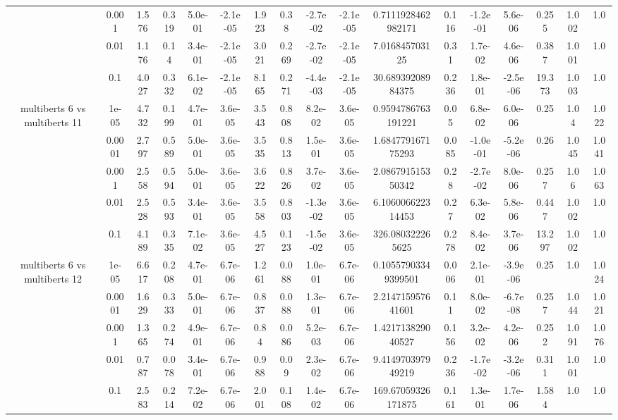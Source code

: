 \begin{tabular}{|c|c|c|c|c|c|c|c|c|c|c|c|c|c|c|c|c|}
 & 0.001 & 1.576 & 0.319 & 5.0e-01 & -2.1e-05 & 1.923 & 0.38 & -2.7e-02 & -2.1e-05 & 0.7111928462982171 & 0.116 & -1.2e-01 & 5.6e-06 & 0.255 & 1.002 & 1.0 \\
 & 0.01 & 1.176 & 0.14 & 3.4e-01 & -2.1e-05 & 3.021 & 0.269 & -2.7e-02 & -2.1e-05 & 7.016845703125 & 0.31 & 1.7e-02 & 4.6e-06 & 0.387 & 1.001 & 1.0 \\
 & 0.1 & 4.027 & 0.332 & 6.1e-02 & -2.1e-05 & 8.165 & 0.271 & -4.4e-03 & -2.1e-05 & 30.68939208984375 & 0.236 & 1.8e-01 & -2.5e-06 & 19.373 & 1.003 & 1.0 \\
\hline
\multirow{5}{*}{multiberts 6 vs multiberts 11} & 1e-05 & 4.732 & 0.199 & 4.7e-01 & 3.6e-05 & 3.543 & 0.808 & 8.2e-02 & 3.6e-05 & 0.9594786763191221 & 0.05 & 6.8e-02 & 6.0e-06 & 0.25 & 1.04 & 1.022 \\
 & 0.0001 & 2.797 & 0.589 & 5.0e-01 & 3.6e-05 & 3.535 & 0.813 & 1.5e-01 & 3.6e-05 & 1.684779167175293 & 0.085 & -1.0e-01 & -5.2e-06 & 0.26 & 1.045 & 1.041 \\
 & 0.001 & 2.558 & 0.594 & 5.0e-01 & 3.6e-05 & 3.622 & 0.826 & 3.7e-02 & 3.6e-05 & 2.086791515350342 & 0.28 & -2.7e-02 & 8.0e-06 & 0.257 & 1.06 & 1.063 \\
 & 0.01 & 2.528 & 0.593 & 3.4e-01 & 3.6e-05 & 3.558 & 0.803 & -1.3e-02 & 3.6e-05 & 6.106006622314453 & 0.27 & 6.3e-02 & 5.8e-06 & 0.447 & 1.002 & 1.0 \\
 & 0.1 & 4.189 & 0.335 & 7.1e-02 & 3.6e-05 & 4.527 & 0.123 & -1.5e-02 & 3.6e-05 & 326.080322265625 & 0.278 & 8.4e-02 & 3.7e-06 & 13.297 & 1.002 & 1.0 \\
\hline
\multirow{5}{*}{multiberts 6 vs multiberts 12} & 1e-05 & 6.617 & 0.208 & 4.7e-01 & 6.7e-06 & 1.261 & 0.088 & 1.0e-01 & 6.7e-06 & 0.10557903349399501 & 0.006 & 2.1e-01 & -3.9e-06 & 0.25 & 1.0 & 1.024 \\
 & 0.0001 & 1.629 & 0.333 & 5.0e-01 & 6.7e-06 & 0.837 & 0.088 & 1.3e-01 & 6.7e-06 & 2.214715957641601 & 0.11 & 8.0e-02 & -6.7e-08 & 0.257 & 1.044 & 1.021 \\
 & 0.001 & 1.365 & 0.274 & 4.9e-01 & 6.7e-06 & 0.84 & 0.086 & 5.2e-03 & 6.7e-06 & 1.421713829040527 & 0.156 & 3.2e-02 & 4.2e-06 & 0.252 & 1.091 & 1.076 \\
 & 0.01 & 0.787 & 0.078 & 3.4e-01 & 6.7e-06 & 0.988 & 0.09 & 2.3e-02 & 6.7e-06 & 9.414970397949219 & 0.236 & -1.7e-02 & -3.2e-06 & 0.311 & 1.001 & 1.0 \\
 & 0.1 & 2.583 & 0.214 & 7.2e-02 & 6.7e-06 & 2.001 & 0.108 & 1.4e-02 & 6.7e-06 & 169.67059326171875 & 0.161 & 1.3e-01 & 1.7e-06 & 1.584 & 1.0 & 1.0 \\

\end{tabular}
